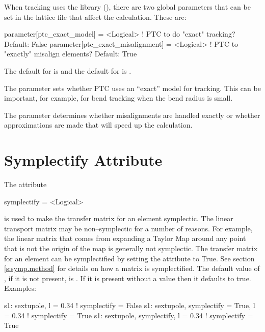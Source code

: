 When tracking uses the  library (), there are two
global parameters that can be set in the lattice file that affect the
calculation. These are:
\begin{example}
  parameter[ptc_exact_model]        = <Logical>  ! PTC to do "exact" tracking? Default: False
  parameter[ptc_exact_misalignment] = <Logical>  ! PTC to "exactly" misalign elements? Default: True
\end{example}
The default for  is  and the default for
 is . 

The  parameter sets whether PTC uses an ``exact''
model for tracking. This can be important, for example, for bend
tracking when the bend radius is small.

The  parameter determines whether
misalignments are handled exactly or whether approximations are made
that will speed up the calculation.

\section{Symplectify Attribute}
\label{s:symp}

The  attribute
\begin{example}
  symplectify = <Logical>
\end{example}
is used to make the transfer matrix for an element symplectic. The
linear transport matrix may be non--symplectic for a number of
reasons.  For example, the linear matrix that comes from expanding a
Taylor Map around any point that is not the origin of the map is
generally not symplectic. The transfer matrix for an element can be
symplectified by setting the  attribute to True. See
section \ref{s:symp.method} for details on how a matrix is
symplectified. The default value of , if it is not
present, is . If it is present without a value then it
defaults to true. Examples:
\begin{example}
  s1: sextupole, l = 0.34                       ! symplectify = False
  s1: sextupole, symplectify = True, l = 0.34   ! symplectify = True
  s1: sextupole, symplectify, l = 0.34          ! symplectify = True
\end{example}


